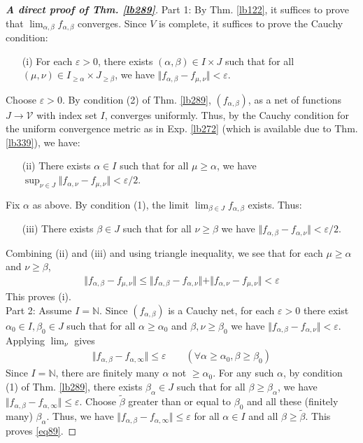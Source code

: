 \documentclass[12pt,b5paper,notitlepage]{article}
\theoremstyle{definition}
\theoremstyle{plain}
\newcommand{\mc}{\mathcal}
\newcommand{\wtd}{\widetilde}
\newcommand{\Nbb}{\mathbb N}
\newcommand{\eps}{\varepsilon}
\numberwithin{equation}{section}
\begin{document}
\begin{proof}[\textbf{A direct proof of Thm. \ref{lb289}}]
Part 1: By Thm. \ref{lb122}, it suffices to prove that $\lim_{\alpha,\beta}f_{\alpha,\beta}$ converges.  Since $V$ is complete, it suffices to prove the Cauchy condition:
\begin{itemize}
\item[(i)] For each $\eps>0$, there exists $(\alpha,\beta)\in I\times J$ such that for all $(\mu,\nu)\in I_{\geq\alpha}\times J_{\geq\beta}$, we have $\Vert f_{\alpha,\beta}-f_{\mu,\nu}\Vert<\eps$.
\end{itemize}
Choose $\eps>0$. By condition (2) of Thm. \ref{lb289}, $(f_{\alpha,\beta})$, as a net of functions $J\rightarrow \mc V$ with index set $I$, converges uniformly. Thus, by the Cauchy condition for the uniform convergence metric as in Exp. \ref{lb272} (which is available due to Thm. \ref{lb339}), we have:
\begin{itemize}
\item[(ii)] There exists $\alpha\in I$ such that for all $\mu\geq\alpha$, we have $\sup_{\nu\in J}\Vert f_{\alpha,\nu}-f_{\mu,\nu}\Vert<\eps/2$.
\end{itemize}
Fix $\alpha$ as above. By condition (1), the limit $\lim_{\beta\in J} f_{\alpha,\beta}$ exists. Thus:
\begin{itemize}
\item[(iii)] There exists $\beta\in J$ such that for all $\nu\geq\beta$ we have $\Vert f_{\alpha,\beta}-f_{\alpha,\nu}\Vert<\eps/2$.
\end{itemize}
Combining (ii) and (iii) and using triangle inequality, we see that for each $\mu\geq\alpha$ and $\nu\geq\beta$,
\begin{align*}
\Vert f_{\alpha,\beta}-f_{\mu,\nu}\Vert\leq \Vert f_{\alpha,\beta}-f_{\alpha,\nu}\Vert+\Vert f_{\alpha,\nu}-f_{\mu,\nu}\Vert<\eps
\end{align*}
This proves (i).\\[-1ex]

Part 2: Assume $I=\Nbb$. Since $(f_{\alpha,\beta})$ is a Cauchy net, for each $\eps>0$ there exist $\alpha_0\in I,\beta_0\in J$ such that for all $\alpha\geq\alpha_0$ and  $\beta,\nu\geq\beta_0$ we have $\Vert f_{\alpha,\beta}-f_{\alpha,\nu}\Vert<\eps$. Applying $\lim_\nu$ gives
\begin{align*}
\Vert f_{\alpha,\beta}-f_{\alpha,\infty}\Vert\leq\eps\qquad(\forall\alpha\geq\alpha_0,\beta\geq\beta_0)
\end{align*}
Since $I=\Nbb$, there are finitely many $\alpha$ not $\geq\alpha_0$.  For any such $\alpha$, by condition (1) of Thm. \ref{lb289}, there exists $\beta_\alpha\in J$ such that for all $\beta\geq\beta_{\alpha}$, we have $\Vert f_{\alpha,\beta}-f_{\alpha,\infty}\Vert\leq\eps$. Choose $\wtd\beta$  greater than or equal to $\beta_0$ and all these (finitely many) $\beta_\alpha$. Thus, we have $\Vert f_{\alpha,\beta}-f_{\alpha,\infty}\Vert\leq\eps$ for all $\alpha\in I$ and all $\beta\geq\wtd\beta$. This proves \eqref{eq89}.
\end{proof}
\end{document}
